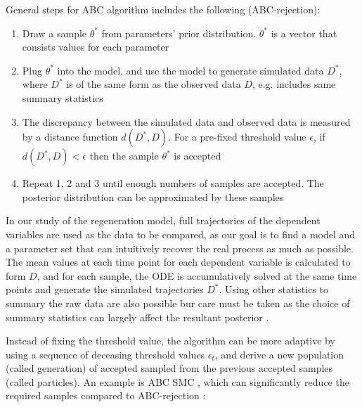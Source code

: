 General steps for ABC algorithm includes the following (ABC-rejection):

\begin{enumerate}
    \item Draw a sample $\theta^*$ from parameters' prior distribution. $\theta^*$ is a vector that consists values for each parameter
    \item Plug $\theta^*$ into the model, and use the model to generate simulated data $D^*$, where $D^*$ is of the same form as the observed data $D$, e.g. includes same summary statistics
    \item The discrepancy between the simulated data and observed data is measured by a distance function $d(D^*, D)$. For a pre-fixed threshold value $\epsilon$, if $d(D^*, D)<\epsilon$ then the sample $\theta^*$ is accepted
    \item Repeat 1, 2 and 3 until enough numbers of samples are accepted. The posterior distribution can be approximated by these samples
\end{enumerate}

In our study of the regeneration model, full trajectories of the dependent variables are used as the data to be compared, as our goal is to find a model and a parameter set that can intuitively recover the real process as much as possible. The mean values at each time point for each dependent variable is calculated to form $D$, and for each sample, the ODE is accumulatively solved at the same time points and generate the simulated trajectories $D^*$. Using other statistics to summary the raw data are also possible bur care must be taken as the choice of summary statistics can largely affect the resultant posterior \cite{summaryD, summaryD2}.

Instead of fixing the threshold value, the algorithm can be more adaptive by using a sequence of deceasing threshold values $\epsilon_t$, and derive a new population (called generation) of accepted sampled from the previous accepted samples (called particles). An example is ABC SMC \cite{Toni}, which can significantly reduce the required samples compared to ABC-rejection \cite{ref:disease}:

